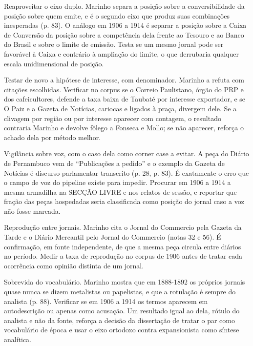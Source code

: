 \begin{dialogo}
\item Reaproveitar o eixo duplo. Marinho separa a posição sobre a
conversibilidade da posição sobre quem emite, e é o segundo eixo que produz
suas combinações inesperadas (p. 83). O análogo em 1906 a 1914 é separar a
posição sobre a Caixa de Conversão da posição sobre a competência dela frente
ao Tesouro e ao Banco do Brasil e sobre o limite de emissão. Testa se um mesmo
jornal pode ser favorável à Caixa e contrário à ampliação do limite, o que
derrubaria qualquer escala unidimensional de posição.

\item Testar de novo a hipótese de interesse, com denominador. Marinho a
refuta com citações escolhidas. Verificar no corpus se o Correio Paulistano,
órgão do PRP e dos cafeicultores, defende a taxa baixa de Taubaté por
interesse exportador, e se O Paiz e a Gazeta de Notícias, cariocas e ligados à
praça, divergem dele. Se a clivagem por região ou por interesse aparecer com
contagem, o resultado contraria Marinho e devolve fôlego a Fonseca e Mollo; se
não aparecer, reforça o achado dela por método melhor.

\item Vigilância sobre voz, com o caso dela como corner case a evitar. A peça
do Diário de Pernambuco vem de ``Publicações a pedido'' e o exemplo da Gazeta
de Notícias é discurso parlamentar transcrito (p. 28, p. 83). É exatamente o
erro que o campo de voz do pipeline existe para impedir. Procurar em 1906 a
1914 a mesma armadilha na SECÇÃO LIVRE e nos relatos de sessão, e reportar que
fração das peças hospedadas seria classificada como posição do jornal caso a
voz não fosse marcada.

\item Reprodução entre jornais. Marinho cita o Jornal do Commercio pela Gazeta
da Tarde e o Diário Mercantil pelo Jornal do Commercio (notas 32 e 56). É
confirmação, em fonte independente, de que a mesma peça circula entre diários
no período. Medir a taxa de reprodução no corpus de 1906 antes de tratar cada
ocorrência como opinião distinta de um jornal.

\item Sobrevida do vocabulário. Marinho mostra que em 1888-1892 os próprios
jornais quase nunca se dizem metalistas ou papelistas, e que a rotulação é
sempre do analista (p. 88). Verificar se em 1906 a 1914 os termos aparecem em
autodescrição ou apenas como acusação. Um resultado igual ao dela, rótulo do
analista e não da fonte, reforça a decisão da dissertação de tratar o par como
vocabulário de época e usar o eixo ortodoxo contra expansionista como síntese
analítica.
\end{dialogo}


